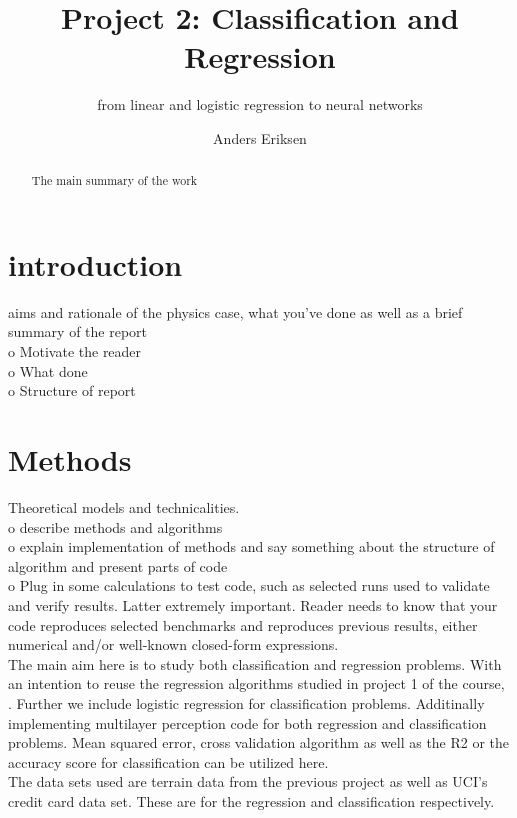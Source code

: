 \documentclass[12pt, a4paper]{scrartcl}
\title{Project 2: Classification and Regression}
\subtitle{from linear and logistic regression to neural networks}
\author{Anders Eriksen}
\date{}
\begin{document}
\maketitle
\tableofcontents
\begin{abstract}
    The main summary of the work
\end{abstract}

\section{introduction}
    aims and rationale of the physics case, what you've done as well as a brief summary of 
the report \\
    o   Motivate the reader\\
    o   What done\\
    o   Structure of report\\
\section{Methods}
    Theoretical models and technicalities. \\
    o   describe methods and algorithms\\
    o   explain implementation of methods and say something about the structure of
        algorithm and present parts of code\\
    o   Plug in some calculations to test code, such as selected runs used to validate and
        verify results. Latter extremely important. Reader needs to know that your code
        reproduces selected benchmarks and reproduces previous results, either numerical 
        and/or well-known closed-form expressions. \\

   The main aim here is to study both classification and regression problems. With an intention 
to reuse the regression algorithms studied in project 1 of the course, \cite{project1}. Further 
we include logistic regression for classification problems. Additinally implementing multilayer 
perception code for both regression and classification problems. Mean squared error, cross 
validation algorithm as well as the R2 or the accuracy score for classification can be utilized 
here. \\

    The data sets used are terrain data from the previous project as well as UCI's credit card 
data set. These are for the regression and classification respectively. 
\\
\end{document}
